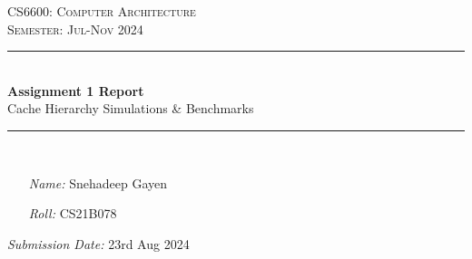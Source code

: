 \thispagestyle{empty} %
\begin{titlepage}
\begin{center}
	\doublespacing %
	\textsc{\huge CS6600: Computer Architecture}\\
	\vspace{2.0cm} %
	\onehalfspacing
	\textsc{\Large Semester: Jul-Nov 2024}\\
	\vspace{1.0cm}
	
	\rule{\linewidth}{0.5mm}\\ %
	\vspace{1.4cm}
	\huge \textbf{Assignment 1 Report}\\ %
	\vspace{1cm}
	\large Cache Hierarchy Simulations \& Benchmarks \normalsize
	\vspace{0.3cm}
	\rule{\linewidth}{0.5mm}\\
	\vspace{2.4cm}
\end{center}

\onehalfspacing

\begin{minipage}[t]{0.8\textwidth}
	\begin{itemize}
	\item[\emph{Name:}] Snehadeep Gayen
	\item[\emph{Roll:}] CS21B078
	\end{itemize}
\end{minipage}

\vspace{2.9cm}

\flushright \emph{Submission Date:} 23rd Aug 2024
\end{titlepage}
\restoregeometry

\onehalfspacing